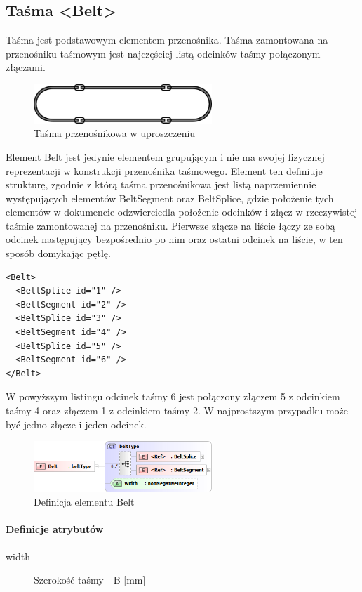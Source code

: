 \documentclass[12pt,a4paper]{article}
\begin{document}
\subsection{Taśma <Belt>}
Taśma jest podstawowym elementem przenośnika. Taśma zamontowana na przenośniku
taśmowym jest najczęściej listą odcinków taśmy połączonym złączami.

\begin{figure}[h]
  \centering
  \includegraphics[width=0.6\textwidth]{png/tasma}
  \caption{Taśma przenośnikowa w uproszczeniu}
  \label{fig:belt-drw}
\end{figure}

Element Belt jest jedynie elementem grupującym i nie ma swojej fizycznej
reprezentacji w konstrukcji przenośnika taśmowego. Element ten definiuje
strukturę, zgodnie z którą taśma przenośnikowa jest listą naprzemiennie
występujących elementów BeltSegment oraz BeltSplice, gdzie położenie tych
elementów w dokumencie odzwierciedla położenie odcinków i złącz w rzeczywistej
taśmie zamontowanej na przenośniku. Pierwsze złącze na liście łączy ze sobą
odcinek następujący bezpośrednio po nim oraz ostatni odcinek na liście, w ten
sposób domykając pętlę.

\begin{verbatim}
<Belt>
  <BeltSplice id="1" />
  <BeltSegment id="2" />
  <BeltSplice id="3" />
  <BeltSegment id="4" />
  <BeltSplice id="5" />
  <BeltSegment id="6" />
</Belt>
\end{verbatim}

W powyższym listingu odcinek taśmy 6 jest połączony złączem 5 z odcinkiem taśmy
4 oraz złączem 1 z odcinkiem taśmy 2. W najprostszym przypadku może być jedno
złącze i jeden odcinek.

\begin{figure}[h]
  \centering
  \includegraphics[width=0.6\textwidth]{png/belt_xsd2}
  \caption{Definicja elementu Belt}
  \label{fig:belt-xsd}
\end{figure}

\paragraph{Definicje atrybutów}
\begin{description}
\item[width] Szerokość taśmy - B [mm]
\end{description}
\end{document}

